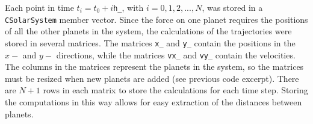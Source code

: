 \documentclass[prb,aps,twocolumn,showpacs,10pt]{revtex4-1}
\begin{document}
Each point in time $t_i = t_0+i$\texttt{h\_}, with $i=0,1,2, ..., N$, was stored in a \texttt{CSolarSystem} member vector. Since the force on one planet requires the positions of all the other planets in the system, the calculations of the trajectories were stored in several matrices. The matrices \texttt{x\_} and \texttt{y\_} contain the positions in the $x-$ and $y-$ directions, while the matrices \texttt{vx\_} and \texttt{vy\_} contain the velocities. The columns in the matrices represent the planets in the system, so the matrices must be resized when new planets are added (see previous code excerpt). There are $N+1$ rows in each matrix to store the calculations for each time step. Storing the computations in this way allows for easy extraction of the distances between planets.\\
\end{document}
